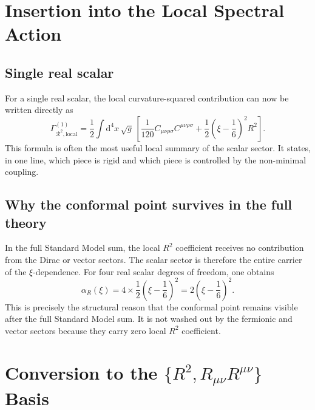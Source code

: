 \documentclass[11pt,a4paper]{article}
\newcommand{\dd}{\mathrm{d}}
\newcommand{\Weylsq}{C_{\mu\nu\rho\sigma}C^{\mu\nu\rho\sigma}}
\newcommand{\Rsq}{R^2}
\newcommand{\Ricsq}{R_{\mu\nu}R^{\mu\nu}}
\theoremstyle{definition}
\theoremstyle{remark}
\begin{document}
\section{Insertion into the Local Spectral Action}
\label{sec:spectral}

\subsection{Single real scalar}

For a single real scalar, the local curvature-squared contribution can now be
written directly as
\begin{equation}
  \Gamma^{(1)}_{\mathcal R^2,\mathrm{local}}
  = \frac{1}{2}\int \dd^4x\,\sqrt{g}\,
  \left[
    \frac{1}{120}\Weylsq
    + \frac{1}{2}\left(\xi - \frac{1}{6}\right)^2 \Rsq
  \right].
  \label{eq:local-scalar-action}
\end{equation}
This formula is often the most useful local summary of the scalar sector.  It
states, in one line, which piece is rigid and which piece is controlled by
the non-minimal coupling.

\subsection{Why the conformal point survives in the full theory}

In the full Standard Model sum, the local $R^2$ coefficient receives no
contribution from the Dirac or vector sectors.  The scalar sector is
therefore the entire carrier of the $\xi$-dependence.  For four real scalar
degrees of freedom, one obtains
\begin{equation}
  \alpha_R(\xi)
  = 4 \times \frac{1}{2}\left(\xi - \frac{1}{6}\right)^2
  = 2\left(\xi - \frac{1}{6}\right)^2.
  \label{eq:alphaR-full}
\end{equation}
This is precisely the structural reason that the conformal point remains
visible after the full Standard Model sum.  It is not washed out by the
fermionic and vector sectors because they carry zero local $R^2$ coefficient.

\section{Conversion to the \texorpdfstring{$\{R^2,\Ricsq\}$}{R2,Ricci2} Basis}
\label{sec:basis}
\end{document}
